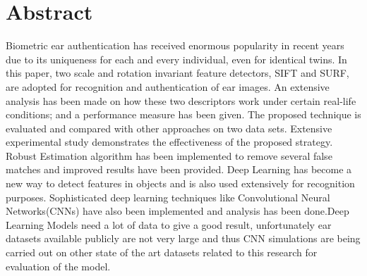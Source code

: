 \chapter*{Abstract} 

Biometric ear authentication has received enormous popularity in recent years due to its uniqueness for each and every individual, even for identical twins. In this paper, two scale and rotation invariant feature detectors, SIFT and SURF, are adopted for recognition and authentication of ear images. An extensive analysis has been made on how these two descriptors work under certain real-life conditions; and a performance measure has been given. The proposed technique is evaluated and compared with other approaches on two data sets. Extensive experimental study demonstrates the effectiveness of the proposed strategy. Robust Estimation algorithm has been implemented to remove several false matches and improved results have been provided. Deep Learning has become a new way to detect features in objects and is also used extensively for recognition purposes. Sophisticated deep learning techniques like Convolutional Neural Networks(CNNs) have also been implemented and analysis has been done.Deep Learning Models need a lot of data to give a good result, unfortunately ear datasets available publicly are not very large and thus CNN simulations are being carried out on other state of the art datasets related to this research for evaluation of the model.

